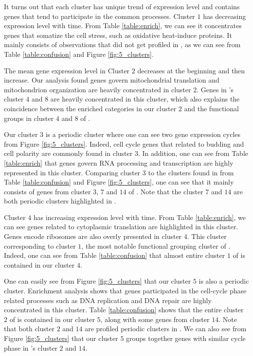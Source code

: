 \documentclass[12pt]{article}
\begin{document}
It turns out that each cluster has unique trend of expression level and contains genes that tend to participate in the common processes. Cluster $1$ has decreasing expression level with time. From Table \ref{table:enrich}, we can see it concentrates genes that somatize the cell stress, such as oxidative heat-induce proteins. It mainly consists of observations that did not get profiled in \cite{tavazoie1999systematic}, as we can see from Table \ref{table:confusion} and Figure \ref{fig:5_clusters}.

The mean gene expression level in Cluster $2$ decreases at the beginning and then increase. Our analysis found genes govern mitochondrial translation and mitochondrion organization are heavily concentrated in cluster $2$. Genes in \cite{tavazoie1999systematic}'s cluster $4$ and $8$ are heavily concentrated in this cluster, which also explains the coincidence between the enriched categories in our cluster $2$ and the functional groups in cluster $4$ and $8$ of    \cite{tavazoie1999systematic}.

Our cluster $3$ is a periodic cluster where one can see two gene expression cycles from Figure \ref{fig:5_clusters}. Indeed, cell cycle genes that related to budding and cell polarity are commonly found in cluster $3$. In addition, one can see from Table \ref{table:enrich} that genes govern RNA processing and transcription are highly represented in this cluster. Comparing cluster $3$ to the clusters found in \cite{tavazoie1999systematic} from Table \ref{table:confusion} and Figure \ref{fig:5_clusters}, one can see that it mainly consists of genes from cluster $3$, $7$ and $14$ of \cite{tavazoie1999systematic}. Note that the cluster $7$ and $14$ are both periodic clusters highlighted in \cite{tavazoie1999systematic}.

Cluster $4$ has increasing expression level with time. From Table \ref{table:enrich}, we can see genes related to cytoplasmic translation are highlighted in this cluster. Genes encode ribosomes are also overly presented in cluster $4$. This cluster corresponding to cluster $1$, the most notable functional grouping cluster of \cite{tavazoie1999systematic}. Indeed, one can see from Table \ref{table:confusion} that almost entire cluster $1$ of  \cite{tavazoie1999systematic} is contained in our cluster $4$.

One can easily see from Figure \ref{fig:5_clusters} that our cluster $5$ is also a periodic cluster. Enrichment analysis shows that genes participated in the cell-cycle phase related processes such as DNA replication and DNA repair are highly concentrated in this cluster. Table \ref{table:confusion} shows that the entire cluster $2$ of \cite{tavazoie1999systematic} is contained in our cluster $5$, along with some genes from cluster $14$. Note that both cluster $2$ and $14$ are profiled periodic clusters in \cite{tavazoie1999systematic}. We can also see from Figure \ref{fig:5_clusters} that our cluster $5$ groups together genes with similar cycle phase in \cite{tavazoie1999systematic}'s cluster $2$ and $14$. 
\end{document}

